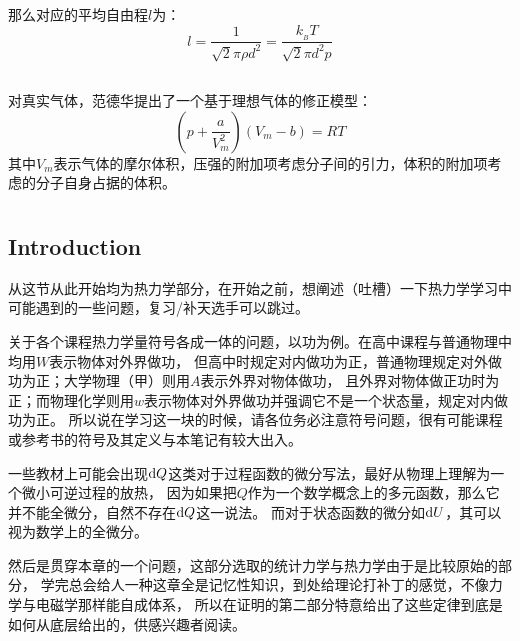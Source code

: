             那么对应的平均自由程$l$为：
            \begin{equation}
                l =  \frac{1}{\sqrt{2}\pi \rho d^{2}} = \frac{k_{_B}T}{\sqrt{2}\pi d^{2}p}
                \nonumber
            \end{equation}
        \subsection[范德华状态方程]{}
            对真实气体，范德华提出了一个基于理想气体的修正模型：
            \begin{equation}
                (p+\frac{a}{V_{m}^{2}})(V_{m}-b)=RT
                \nonumber
            \end{equation}
            其中$V_m$表示气体的摩尔体积，压强的附加项考虑分子间的引力，体积的附加项考虑的分子自身占据的体积。
    \section[热力学第零定律]{}
        \subsection[引言]{Introduction}
            从这节从此开始均为热力学部分，在开始之前，想阐述（吐槽）一下热力学学习中可能遇到的一些问题，复习/补天选手可以跳过。
           
            关于各个课程热力学量符号各成一体的问题，以功为例。在高中课程与普通物理中均用$W$表示物体对外界做功，
            但高中时规定对内做功为正，普通物理规定对外做功为正；大学物理（甲）则用$A$表示外界对物体做功，
            且外界对物体做正功时为正；而物理化学则用$w$表示物体对外界做功并强调它不是一个状态量，规定对内做功为正。
            所以说在学习这一块的时候，请各位务必注意符号问题，很有可能课程或参考书的符号及其定义与本笔记有较大出入。

            一些教材上可能会出现$\mathrm{d}{Q}$这类对于过程函数的微分写法，最好从物理上理解为一个微小可逆过程的放热，
            因为如果把$Q$作为一个数学概念上的多元函数，那么它并不能全微分，自然不存在$\mathrm{d}{Q}$这一说法。
            而对于状态函数的微分如$\mathrm{d}{U}$，其可以视为数学上的全微分。

            然后是贯穿本章的一个问题，这部分选取的统计力学与热力学由于是比较原始的部分，
            学完总会给人一种这章全是记忆性知识，到处给理论打补丁的感觉，不像力学与电磁学那样能自成体系，
            所以在证明的第二部分特意给出了这些定律到底是如何从底层给出的，供感兴趣者阅读。
